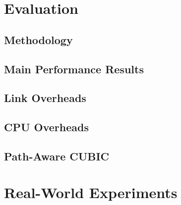 \section{Evaluation}

\subsection{Methodology}
\subsection{Main Performance Results}
\subsection{Link Overheads}
\subsection{CPU Overheads}
\subsection{Path-Aware CUBIC}

\section{Real-World Experiments}
